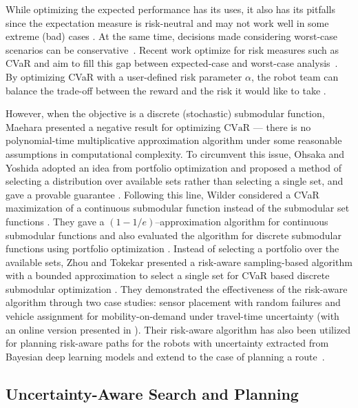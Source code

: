 While optimizing the expected performance has its uses, it also has its pitfalls since the expectation measure is risk-neutral and may not work well in some extreme (bad) cases \cite{zhou2018approximation,majumdar2020should}. At the same time, decisions made considering worst-case scenarios can be conservative~\cite{zhou2017active,zhou2018active,zhou2018resilient}. Recent work optimize for risk measures such as CVaR and aim to fill this gap between expected-case and worst-case analysis~\cite{rockafellar2000optimization,majumdar2020should}. By optimizing CVaR with a user-defined risk parameter $\alpha$, the robot team can balance the trade-off between the reward and the risk it would like to take \cite{zhou2018approximation}. 

However, when the objective is a discrete (stochastic) submodular function,
Maehara presented a negative result for optimizing $\text{CVaR}$ \cite{maehara2015risk}--- there is no \\ polynomial-time multiplicative approximation algorithm under some reasonable assumptions in computational complexity. To circumvent this issue, Ohsaka and Yoshida adopted an idea from {portfolio optimization} and proposed a method of selecting a distribution over available sets rather than selecting a single set, and gave a provable guarantee \cite{ohsaka2017portfolio}. Following this line, Wilder considered a CVaR maximization of a {continuous submodular} function instead of the submodular set functions \cite{wilder2018risk}. They gave a $(1 - 1/e)$--approximation algorithm for {continuous submodular} functions and also evaluated the algorithm for discrete submodular functions using {portfolio optimization} \cite{ohsaka2017portfolio}. Instead of selecting a   portfolio over the available sets, Zhou and Tokekar presented a risk-aware sampling-based algorithm with a bounded approximation to select a single set for CVaR based discrete submodular optimization \cite{zhou2018approximation,zhou2019risk}. They demonstrated the effectiveness of the risk-aware algorithm through two case studies: sensor placement with random failures and vehicle assignment for mobility-on-demand under travel-time uncertainty (with an online version presented in \cite{zhou2019risk}). Their risk-aware algorithm has also been utilized for planning risk-aware paths for the robots with uncertainty extracted from Bayesian deep learning models \cite{Toubeh2019risk2,sharma2020risk} and extend to the case of planning a route~\cite{balasubramanian2020risk}.

\subsection{Uncertainty-Aware Search and Planning} \label{subsec:risk_graph_search}

